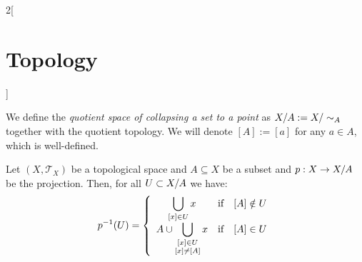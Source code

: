 \documentclass[../../../main.tex]{subfiles}
\begin{document}
\begin{multicols}{2}[\section{Topology}]
\begin{definition}
    We define the \textit{quotient space of collapsing a set to a point} as $\quot{X}{A}:=\quot{X}{\sim_A}$ together with the quotient topology. We will denote $[A]:=[a]$ for any $a\in A$, which is well-defined.
  \end{definition}
  \begin{prop}
    Let $(X,\mathcal{T}_X)$ be a topological space and $A\subseteq X$ be a subset and $p:X\rightarrow\quot{X}{A}$ be the projection. Then, for all $U\subset\quot{X}{A}$ we have:
    $$
      p^{-1}(U)=\left\{\begin{array}{ccc}
        \displaystyle\bigcup_{[x]\in U}x & \text{if} & [A]\notin U \\
        \displaystyle A\cup \bigcup_{
          \begin{subarray}{c}
            [x]\in U \\
            [x]\ne [A]
          \end{subarray}
        }x                               & \text{if} & [A]\in U
      \end{array}\right.
    $$
  \end{prop}












\end{multicols}
\end{document}
